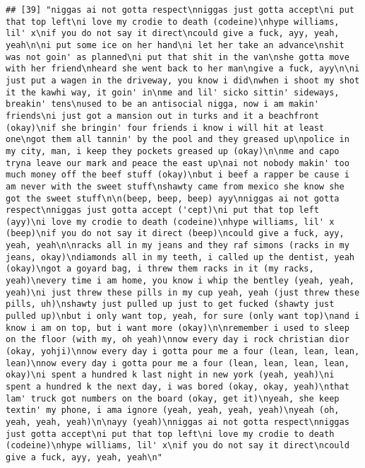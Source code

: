 \documentclass[]{article}
\begin{document}
\begin{verbatim}
## [39] "niggas ai not gotta respect\nniggas just gotta accept\ni put that top left\ni love my crodie to death (codeine)\nhype williams, lil' x\nif you do not say it direct\ncould give a fuck, ayy, yeah, yeah\n\ni put some ice on her hand\ni let her take an advance\nshit was not goin' as planned\ni put that shit in the van\nshe gotta move with her friend\nheard she went back to her man\ngive a fuck, ayy\n\ni just put a wagen in the driveway, you know i did\nwhen i shoot my shot it the kawhi way, it goin' in\nme and lil' sicko sittin' sideways, breakin' tens\nused to be an antisocial nigga, now i am makin' friends\ni just got a mansion out in turks and it a beachfront (okay)\nif she bringin' four friends i know i will hit at least one\ngot them all tannin' by the pool and they greased up\npolice in my city, man, i keep they pockets greased up (okay)\n\nme and capo tryna leave our mark and peace the east up\nai not nobody makin' too much money off the beef stuff (okay)\nbut i beef a rapper be cause i am never with the sweet stuff\nshawty came from mexico she know she got the sweet stuff\n\n(beep, beep, beep) ayy\nniggas ai not gotta respect\nniggas just gotta accept ('cept)\ni put that top left (ayy)\ni love my crodie to death (codeine)\nhype williams, lil' x (beep)\nif you do not say it direct (beep)\ncould give a fuck, ayy, yeah, yeah\n\nracks all in my jeans and they raf simons (racks in my jeans, okay)\ndiamonds all in my teeth, i called up the dentist, yeah (okay)\ngot a goyard bag, i threw them racks in it (my racks, yeah)\nevery time i am home, you know i whip the bentley (yeah, yeah, yeah)\ni just threw these pills in my cup yeah, yeah (just threw these pills, uh)\nshawty just pulled up just to get fucked (shawty just pulled up)\nbut i only want top, yeah, for sure (only want top)\nand i know i am on top, but i want more (okay)\n\nremember i used to sleep on the floor (with my, oh yeah)\nnow every day i rock christian dior (okay, yohji)\nnow every day i gotta pour me a four (lean, lean, lean, lean)\nnow every day i gotta pour me a four (lean, lean, lean, lean, okay)\ni spent a hundred k last night in new york (yeah, yeah)\ni spent a hundred k the next day, i was bored (okay, okay, yeah)\nthat lam' truck got numbers on the board (okay, get it)\nyeah, she keep textin' my phone, i ama ignore (yeah, yeah, yeah, yeah)\nyeah (oh, yeah, yeah, yeah)\n\nayy (yeah)\nniggas ai not gotta respect\nniggas just gotta accept\ni put that top left\ni love my crodie to death (codeine)\nhype williams, lil' x\nif you do not say it direct\ncould give a fuck, ayy, yeah, yeah\n"                                                                                                                                                                                                                                                                                                                                                                                                                                                                                                                                                                                                                                                                                                                                        
\end{verbatim}
\end{document}
